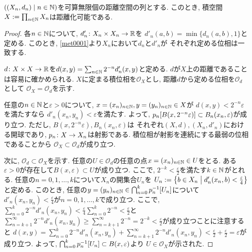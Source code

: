 \documentclass[uplatex, dvipdfmx, a4paper, 12pt, class=jsbook, crop=false]{standalone}
\begin{document}
\begin{proposition}
	$ \setfamily{(X_n, d_n)}{n \in \N} $を可算無限個の距離空間の列とする.
	このとき, 積空間$ X \mathrel{:=} \prod_{n \in \mathbb{N}} X_n $は距離化可能である.
\end{proposition}

\begin{proof}
	各$ n \in \mathbb{N} $について, $ d'_n \colon X_n \times X_n \to \mathbb{R} $を
	$ d'_n(a, b) = \min\{d_n(a,b), 1\} $と定める.
	このとき, \cref{met0001}より$ X_n $において$ d_n $と$ d'_n $が
	それぞれ定める位相は一致する.

	$ d \colon X \times X \to \mathbb{R} $を$ d(x, y) = \sum_{n \in \mathbb{N}}
	2^{-n} d'_n(x, y) $と定める.
	$ d $が$ X $上の距離であることは容易に確かめられる.
	$ X $に定まる積位相を$ \mathcal{O}_X $とし,
	距離$ d $から定める位相を$ \mathcal{O}_d $として
	$ \mathcal{O}_X = \mathcal{O}_d $を示す.

	任意の$ n \in \mathbb{N} $と$ \varepsilon > 0 $について,
	$ x=(x_n)_{n \in \mathbb{N}}, y=(y_n)_{n \in \mathbb{N}} \in X $が
	$ d(x, y) < 2^{-n}\varepsilon $を満たすなら
	$ d'_n(x_n, y_n) < \varepsilon $を満たす.
	よって, $ \mapset{p_n}{B(x, 2^{-n} \varepsilon)} \subset
	B_n(x_n, \varepsilon) $が成り立つ.
	ただし, $ B(x, 2^{-n} \varepsilon), B_n(x_n, \varepsilon) $は
	それぞれ$ (X, d), (X_n, d'_n) $における開球であり,
	$ p_n\colon X\to X_n $は射影である.
	積位相が射影を連続にする最弱の位相であることから
	$ \mathcal{O}_X \subset \mathcal{O}_d $が成り立つ.

	次に, $ \mathcal{O}_d \subset \mathcal{O}_X $を示す.
	任意の$ U \in \mathcal{O}_d $の任意の点$ x=(x_n)_{n \in \mathbb{N}} \in U $をとる.
	ある$ \varepsilon > 0 $が存在して$ B(x, \varepsilon) \subset U $が成り立つ.
	ここで, $ 2^{-k} < \frac{\varepsilon}{2} $を満たす$ k \in \mathbb{N} $がとれる.
	任意の$ n =0, 1, \ldots, k $について$ X_n $の開集合$ U_n $を
	$ U_n \defeq \setcomp{b \in X_n}{d'_n(x_n, b) < \frac{\varepsilon}{4}} $と定める.
	このとき, 任意の$ y=(y_n)_{n \in \N} \in
	\bigcap_{n=0}^k \mapinvset{p_n}{U_n} $について
	$ d'_n(x_n, y_n) < \frac{\varepsilon}{4} $が$ n = 0, 1, \ldots, k $で成り立つ.
	ここで, $ \sum_{n=0}^{k} 2^{-n} d'_n(x_n, y_n) <
	\frac{\varepsilon}{4}\sum_{n=0}^{k} 2^{-n} < \frac{\varepsilon}{2} $と
	$ \sum_{n=k+1}^\infty 2^{-n} d'_n(x_n, y_n) \geq \sum_{n=k+1}^\infty 2^{-n}
	= 2^{-k} < \frac{\varepsilon}{2} $が成り立つことに注意すると
	$ d(x, y) = \sum_{n=0}^{k} 2^{-n} d'_n(x_n, y_n) +
	\sum_{n=k+1}^\infty 2^{-n} d'_n(x_n, y_n) < \frac{\varepsilon}{2} +
	\frac{\varepsilon}{2} = \varepsilon $が成り立つ.
	よって, $ \bigcap_{n=0}^k \mapinvset{p_n}{U_n} \subset B(x, \varepsilon) $より
	$ U \in \mathcal{O}_X $が示された.
\end{proof}
\end{document}
